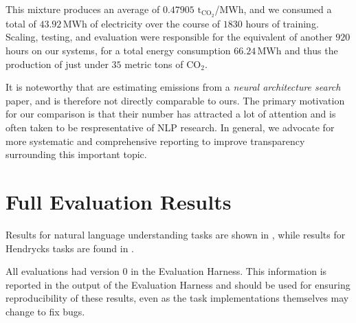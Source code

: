 \documentclass[11pt]{article}
\begin{document}
This mixture produces an average of $0.47905$ $\mathrm{t_{CO_2}}$/MWh, and we consumed a total of $43.92$\,MWh of electricity over the course of $1830$ hours of training. Scaling, testing, and evaluation were responsible for the equivalent of another $920$ hours on our systems, for a total energy consumption $66.24$\,MWh and thus the production of just under $35$ metric tons of $\mathrm{CO_2}$.

It is noteworthy that \citet{strubell2019energy} are estimating emissions from a \textit{neural architecture search} paper, and is therefore not directly comparable to ours. The primary motivation for our comparison is that their number has attracted a lot of attention and is often taken to be respresentative of NLP research. In general, we advocate for more systematic and comprehensive reporting to improve transparency surrounding this important topic.


\section{Full Evaluation Results}\label{app:downstream}

Results for natural language understanding tasks are shown in , while results for Hendrycks tasks are found in .

All evaluations had version 0 in the Evaluation Harness. This information is reported in the output of the Evaluation Harness and should be used for ensuring reproducibility of these results, even as the task implementations themselves may change to fix bugs.

\clearpage

\end{document}
